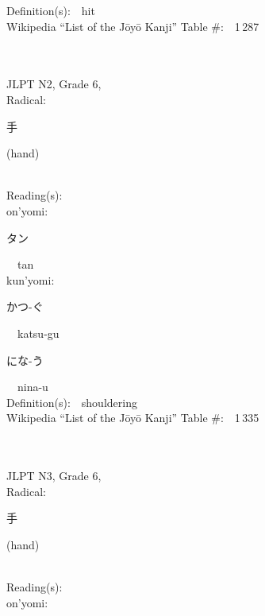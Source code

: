 \begin{multicols}{2}
Definition(s):\ \ hit \\
Wikipedia ``List of the J\=oy\=o Kanji'' Table \#:\ \ 1\,287 \\
\ \ \\
{\fontsize{34pt}{40pt}  }\ \ \\  %
{JLPT N2, Grade 6, \\Radical:\ \ {\begin{CJK}{UTF8}{min} 手 \end{CJK}} (hand) } \\
Reading(s):\ \ \\
{\hspace*{1em}}on'yomi:\ \ \\
{\hspace*{2em}}{\begin{CJK}{UTF8}{min} タン \end{CJK}}\ \ tan\ \ \\
{\hspace*{1em}}kun'yomi:\ \ \\
{\hspace*{2em}}{\begin{CJK}{UTF8}{min} かつ-ぐ \end{CJK}}\ \ katsu-gu\ \ \\
{\hspace*{2em}}{\begin{CJK}{UTF8}{min} にな-う \end{CJK}}\ \ nina-u\ \ \\
Definition(s):\ \ shouldering \\
Wikipedia ``List of the J\=oy\=o Kanji'' Table \#:\ \ 1\,335 \\
\ \ \\
{\fontsize{34pt}{40pt}  }\ \ \\  %
{JLPT N3, Grade 6, \\Radical:\ \ {\begin{CJK}{UTF8}{min} 手 \end{CJK}} (hand) } \\
Reading(s):\ \ \\
{\hspace*{1em}}on'yomi:\ \ \\

\end{multicols}
